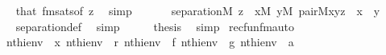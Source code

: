 \begin{isabellebody}
\ \ \ \ \isamarkupfalse%
\ that\ fmsats{\isacharbrackleft}{\kern0pt}of\ {\isachardoublequoteopen}{\isacharbrackleft}{\kern0pt}z{\isacharbrackright}{\kern0pt}{\isachardoublequoteclose}{\isacharbrackright}{\kern0pt}\ \isamarkupfalse%
\ simp\isanewline
\ \ \isamarkupfalse%
\isanewline
\ \ \isamarkupfalse%
\ {\isachardoublequoteopen}separation{\isacharparenleft}{\kern0pt}{\isacharhash}{\kern0pt}{\isacharhash}{\kern0pt}M{\isacharcomma}{\kern0pt}\ {\isasymlambda}z\ {\isachardot}{\kern0pt}\ {\isasymexists}x{\isasymin}M{\isachardot}{\kern0pt}\ {\isasymexists}y{\isasymin}M{\isachardot}{\kern0pt}\ pair{\isacharparenleft}{\kern0pt}{\isacharhash}{\kern0pt}{\isacharhash}{\kern0pt}M{\isacharcomma}{\kern0pt}x{\isacharcomma}{\kern0pt}y{\isacharcomma}{\kern0pt}z{\isacharparenright}{\kern0pt}\ {\isacharampersand}{\kern0pt}\ x\ {\isasymin}\ y{\isacharparenright}{\kern0pt}{\isachardoublequoteclose}\isanewline
\ \ \ \ \isamarkupfalse%
\ separation{\isacharunderscore}{\kern0pt}def\ \isamarkupfalse%
\ simp\isanewline
\ \ \isamarkupfalse%
\ \isamarkupfalse%
\ {\isacharquery}{\kern0pt}thesis\ \isamarkupfalse%
\ simp\isanewline
{}\isamarkupfalse%
%
\endisatagproof
{\isafoldproof}%
%
\isadelimproof
\isanewline
%
\endisadelimproof
\isanewline
{}\isamarkupfalse%
\ recfun{\isacharunderscore}{\kern0pt}fm{\isacharunderscore}{\kern0pt}auto{\isacharcolon}{\kern0pt}\isanewline
\ \ \isanewline
\ \ \ \ {\isachardoublequoteopen}nth{\isacharparenleft}{\kern0pt}i{}{\isacharcomma}{\kern0pt}env{\isacharparenright}{\kern0pt}\ {\isacharequal}{\kern0pt}\ x{\isachardoublequoteclose}\ {\isachardoublequoteopen}nth{\isacharparenleft}{\kern0pt}i{}{\isacharcomma}{\kern0pt}env{\isacharparenright}{\kern0pt}\ {\isacharequal}{\kern0pt}\ r{\isachardoublequoteclose}\ {\isachardoublequoteopen}nth{\isacharparenleft}{\kern0pt}i{}{\isacharcomma}{\kern0pt}env{\isacharparenright}{\kern0pt}\ {\isacharequal}{\kern0pt}\ f{\isachardoublequoteclose}\ {\isachardoublequoteopen}nth{\isacharparenleft}{\kern0pt}i{}{\isacharcomma}{\kern0pt}env{\isacharparenright}{\kern0pt}\ {\isacharequal}{\kern0pt}\ g{\isachardoublequoteclose}\ {\isachardoublequoteopen}nth{\isacharparenleft}{\kern0pt}i{}{\isacharcomma}{\kern0pt}env{\isacharparenright}{\kern0pt}\ {\isacharequal}{\kern0pt}\ a{\isachardoublequoteclose}\isanewline

\end{isabellebody}
